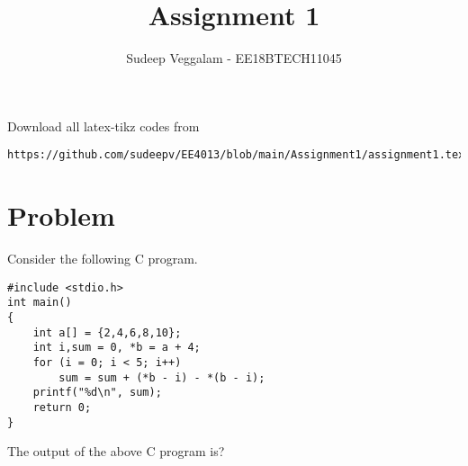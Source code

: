 \documentclass[journal,12pt,twocolumn]{IEEEtran}
\begin{document}
     \def\rightbox#1{\makebox[0in][r]{#1}}
     \def\centbox#1{\makebox[0in]{#1}}
     \def\topbox#1{\raisebox{-\baselineskip}[0in][0in]{#1}}
     \def\midbox#1{\raisebox{-0.5\baselineskip}[0in][0in]{#1}}
\vspace{3cm}
\title{Assignment 1}
\author{Sudeep Veggalam - EE18BTECH11045}
\maketitle
\newpage
\bigskip
\renewcommand{\thefigure}{\theenumi}
\renewcommand{\thetable}{\theenumi}
Download all latex-tikz codes from 
%
\begin{lstlisting}
https://github.com/sudeepv/EE4013/blob/main/Assignment1/assignment1.tex
\end{lstlisting}
\section{Problem}
Consider the following C program.
\begin{lstlisting}
#include <stdio.h>
int main()
{
    int a[] = {2,4,6,8,10};
    int i,sum = 0, *b = a + 4;
    for (i = 0; i < 5; i++)
        sum = sum + (*b - i) - *(b - i);
    printf("%d\n", sum);
    return 0;
}
\end{lstlisting}
The output of the above C program is?
\end{document}
